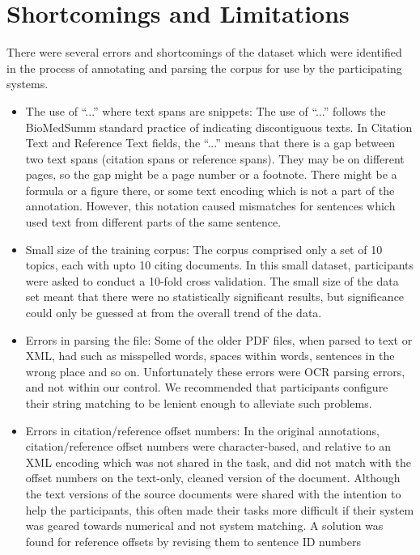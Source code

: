 \documentclass[11pt]{article}
\begin{document}
\section{Shortcomings and Limitations}
There were several errors and shortcomings of the dataset which were
identified in the process of annotating and parsing the corpus for use
by the participating systems. 
\begin{itemize}
\item{The use of ``...'' where text spans are snippets}: The use of
  ``...''  follows the BioMedSumm standard practice of indicating
  discontiguous texts.  In Citation Text and Reference Text fields,
  the ``...'' means that there is a gap between two text spans
  (citation spans or reference spans). They may be on different pages,
  so the gap might be a page number or a footnote. There might be a formula or a figure
  there, or some text encoding which is not a part of the annotation.
  However, this notation caused mismatches for sentences which used
  text from different parts of the same sentence.
\item{Small size of the training corpus:} The corpus comprised only a
  set of 10 topics, each with upto 10 citing documents. In this small
  dataset, participants were asked to conduct a 10-fold cross
  validation. The small size of the data set meant that there were no
  statistically significant results, but significance could only be
  guessed at from the overall trend of the data.
\item{Errors in parsing the file:} Some of the older PDF files, when
  parsed to text or XML, had such as misspelled words, spaces within
  words, sentences in the wrong place and so on. Unfortunately these
  errors were OCR parsing errors, and not within our control. We 
  recommended that  participants configure their string
  matching to be lenient enough to alleviate such problems.
\item{Errors in citation/reference offset numbers:} In the original
  annotations, citation/reference offset numbers were character-based,
  and relative to an XML encoding which was not shared in the task,
  and did not match with the offset numbers on the text-only, cleaned
  version of the document. Although the text versions of the source
  documents were shared with the intention to help the participants,
  this often made their tasks more difficult if their system was
  geared towards numerical and not system matching. A solution was
  found for reference offsets by revising them to sentence ID numbers

\end{itemize}
\end{document}
